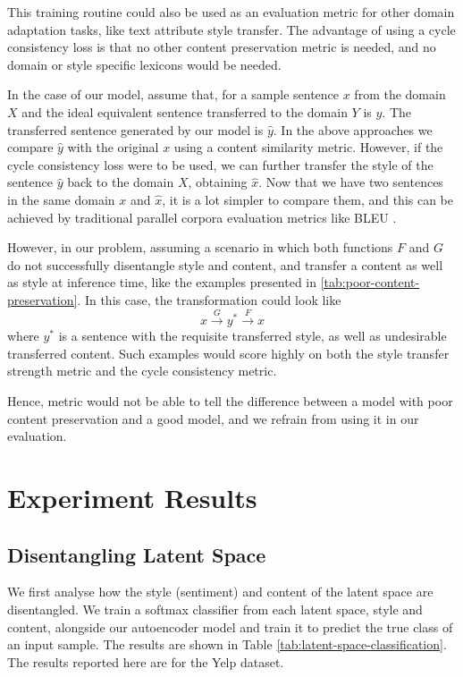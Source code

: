 This training routine could also be used as an evaluation metric for other domain adaptation tasks, like text attribute style transfer. The advantage of using a cycle consistency loss is that no other content preservation metric is needed, and no domain or style specific lexicons would be needed.

In the case of our model, assume that, for a sample sentence $x$ from the domain $X$ and the ideal equivalent sentence transferred to the domain $Y$ is $y$. The transferred sentence generated by our model is $\hat{y}$. In the above approaches we compare $\hat{y}$ with the original $x$ using a content similarity metric. However, if the cycle consistency loss were to be used, we can further transfer the style of the sentence $\hat{y}$ back to the domain $X$, obtaining $\hat{x}$. Now that we have two sentences in the same domain $x$ and $\hat{x}$, it is a lot simpler to compare them, and this can be achieved by traditional parallel corpora evaluation metrics like BLEU \citep{papineni2002bleu}.

However, in our problem, assuming a scenario in which both functions $F$ and $G$ do not successfully disentangle style and content, and transfer a content as well as style at inference time, like the examples presented in \ref{tab:poor-content-preservation}. In this case, the transformation could look like
\begin{equation*}
	x \xrightarrow{G} y^* \xrightarrow{F} x
\end{equation*}
where $y^*$ is a sentence with the requisite transferred style, as well as undesirable transferred content. Such examples would score highly on both the style transfer strength metric and the cycle consistency metric.

Hence, metric would not be able to tell the difference between a model with poor content preservation and a good model, and we refrain from using it in our evaluation.


\section{Experiment Results}

\subsection{Disentangling Latent Space}

We first analyse how the style (sentiment) and content of the latent space are disentangled. We train a softmax classifier from each latent space, style and content, alongside our autoencoder model and train it to predict the true class of an input sample. The results are shown in Table \ref{tab:latent-space-classification}. The results reported here are for the Yelp dataset.

